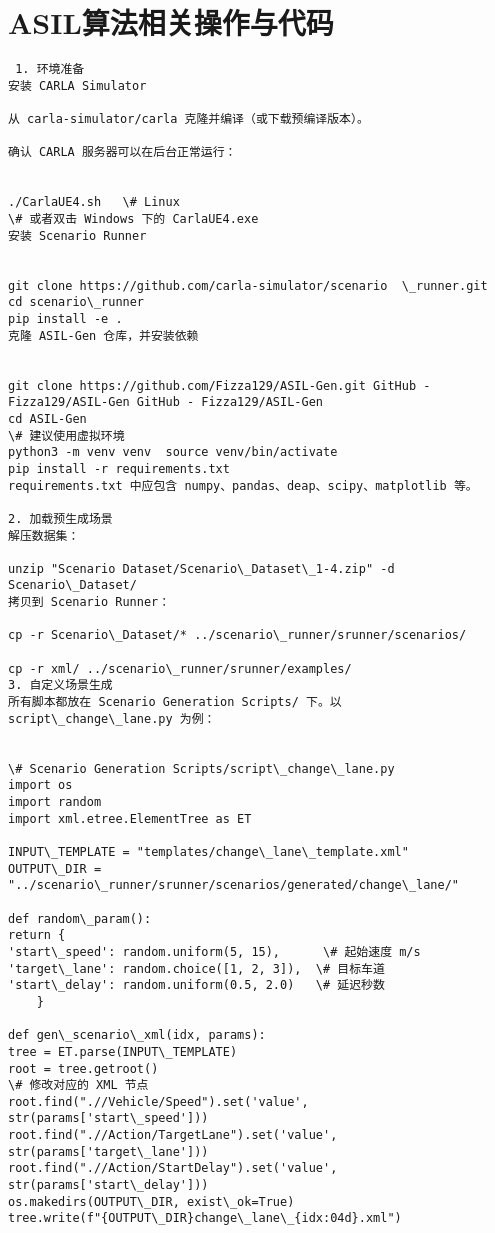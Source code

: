 \section{ASIL算法相关操作与代码}
  \begin{lstlisting}
 1. 环境准备
安装 CARLA Simulator
  	
从 carla-simulator/carla 克隆并编译（或下载预编译版本）。
  	
确认 CARLA 服务器可以在后台正常运行：
  	
  	
./CarlaUE4.sh   \# Linux
\# 或者双击 Windows 下的 CarlaUE4.exe
安装 Scenario Runner
  	
  	
git clone https://github.com/carla-simulator/scenario  \_runner.git
cd scenario\_runner
pip install -e .
克隆 ASIL-Gen 仓库，并安装依赖
  	
  	
git clone https://github.com/Fizza129/ASIL-Gen.git GitHub - Fizza129/ASIL-Gen GitHub - Fizza129/ASIL-Gen 
cd ASIL-Gen
\# 建议使用虚拟环境
python3 -m venv venv  source venv/bin/activate
pip install -r requirements.txt
requirements.txt 中应包含 numpy、pandas、deap、scipy、matplotlib 等。
  	
2. 加载预生成场景
解压数据集：
  	
unzip "Scenario Dataset/Scenario\_Dataset\_1-4.zip" -d Scenario\_Dataset/
拷贝到 Scenario Runner：
  	
cp -r Scenario\_Dataset/* ../scenario\_runner/srunner/scenarios/
  	
cp -r xml/ ../scenario\_runner/srunner/examples/
3. 自定义场景生成
所有脚本都放在 Scenario Generation Scripts/ 下。以 script\_change\_lane.py 为例：
  	
  	
\# Scenario Generation Scripts/script\_change\_lane.py
import os
import random
import xml.etree.ElementTree as ET
  	
INPUT\_TEMPLATE = "templates/change\_lane\_template.xml"
OUTPUT\_DIR = "../scenario\_runner/srunner/scenarios/generated/change\_lane/"
  	
def random\_param():
return {
'start\_speed': random.uniform(5, 15),      \# 起始速度 m/s
'target\_lane': random.choice([1, 2, 3]),  \# 目标车道
'start\_delay': random.uniform(0.5, 2.0)   \# 延迟秒数
  	}
  	
def gen\_scenario\_xml(idx, params):
tree = ET.parse(INPUT\_TEMPLATE)
root = tree.getroot()
\# 修改对应的 XML 节点
root.find(".//Vehicle/Speed").set('value', str(params['start\_speed']))
root.find(".//Action/TargetLane").set('value', str(params['target\_lane']))
root.find(".//Action/StartDelay").set('value', str(params['start\_delay']))
os.makedirs(OUTPUT\_DIR, exist\_ok=True)
tree.write(f"{OUTPUT\_DIR}change\_lane\_{idx:04d}.xml")
  	

\end{lstlisting}
